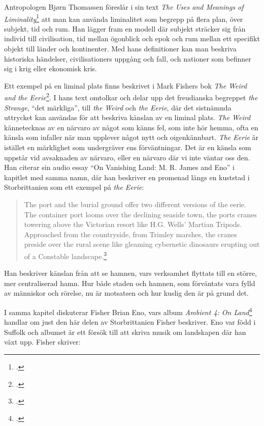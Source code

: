 \documentclass{article}
\begin{document}
Antropologen Bjørn Thomassen föreslår i sin text \emph{The Uses and Meanings of
Liminality}\footcite[12-13]{Thomassen} att man kan använda liminalitet som begrepp på flera plan, över
subjekt, tid och rum. Han lägger fram en modell där subjekt sträcker sig från individ till civilisation, tid
mellan ögonblick och epok och rum mellan ett specifikt objekt till länder och kontinenter. Med hans
definitioner kan man beskriva historiska händelser, civilisationers uppgång och fall, och nationer som
befinner sig i krig eller ekonomisk kris.

Ett exempel på en liminal plats finns beskrivet i Mark Fishers bok \emph{The Weird and the
Eerie}\footcite{Fisher}. I hans text omtolkar och delar upp det freudianska begreppet \emph{the Strange},
``det märkliga'', till \emph{the Weird} och \emph{the Eerie}, där det sistnämnda uttrycket kan användas för
att beskriva känslan av en liminal plats. \emph{The Weird} kännetecknas av en närvaro av något som känns fel,
som inte hör hemma, ofta en känsla som infaller när man upplever något nytt och oigenkännbart. \emph{The
Eerie} är istället en märklighet som undergräver ens förväntningar. Det är en känsla som uppstår vid
avsaknaden av närvaro, eller en närvaro där vi inte väntar oss den. Han citerar sin audio essay ``On Vanishing
Land: M. R. James and Eno'' i kapitlet med samma namn, där han beskriver en promenad längs en kuststad i
Storbrittanien som ett exempel på \emph{the Eerie}:

\begin{quote}
The port and the burial ground offer two different versions of the eerie. The container port looms over the
declining seaside town, the ports cranes towering above the Victorian resort like H.G. Wells' Martian Tripods.
Approached from the countryside, from Trimley marshes, the cranes preside over the rural scene like gleaming
	cybernetic dinosaurs erupting out of a Constable landscape.\footcite[76]{Fisher}
\end{quote}

Han beskriver känslan från att se hamnen, vars verksamhet flyttats till en större, mer centraliserad hamn. 
Hur både staden och hamnen, som förväntats vara fylld av människor och rörelse, nu är motsatsen och hur kuslig
den är på grund det.

I samma kapitel diskuterar Fisher Brian Eno, vars album \emph{Ambient 4: On Land}\footcite{EnoLand} handlar om
just den här delen av Storbrittanien Fisher beskriver. Eno var född i Suffolk och albumet är ett försök till att skriva
musik om landskapen där han växt upp. Fisher skriver: 
\end{document}
